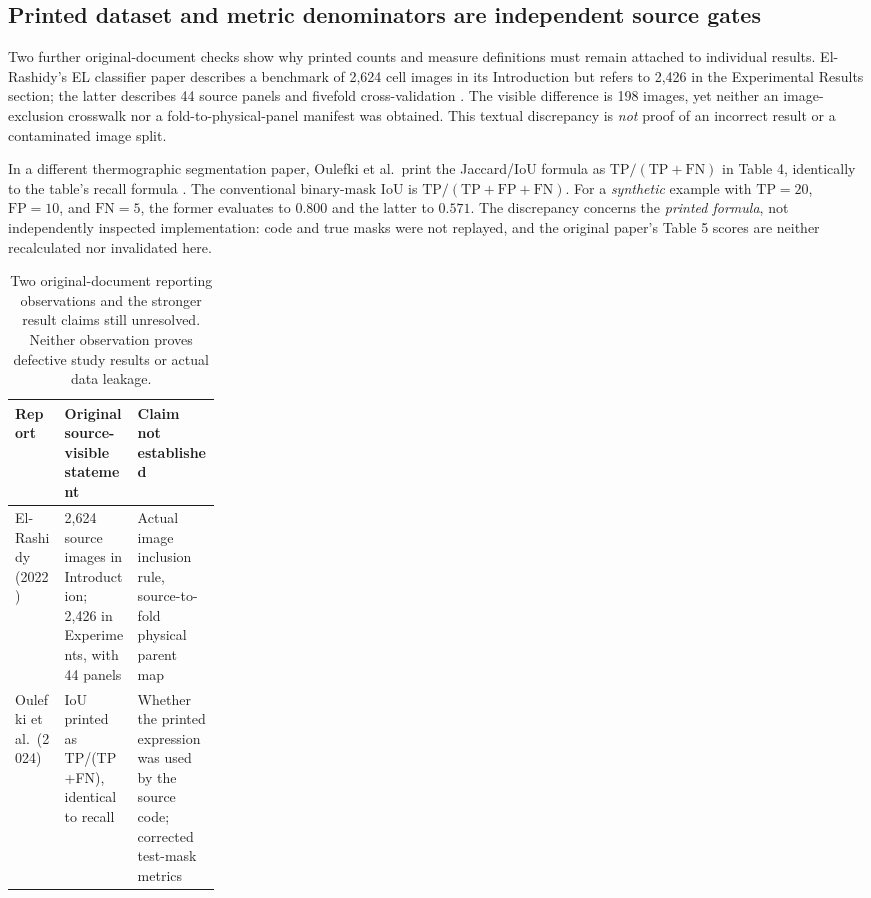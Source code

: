 \documentclass[10pt,a4paper]{article}
\begin{document}
\subsection{Printed dataset and metric denominators are independent source gates}
Two further original-document checks show why printed counts and measure definitions must remain attached to individual results. El-Rashidy's EL classifier paper describes a benchmark of 2,624 cell images in its Introduction but refers to 2,426 in the Experimental Results section; the latter describes 44 source panels and fivefold cross-validation \cite{elrashidy2022}. The visible difference is 198 images, yet neither an image-exclusion crosswalk nor a fold-to-physical-panel manifest was obtained. This textual discrepancy is \emph{not} proof of an incorrect result or a contaminated image split.

In a different thermographic segmentation paper, Oulefki et al.\ print the Jaccard/IoU formula as $\mathrm{TP}/(\mathrm{TP}+\mathrm{FN})$ in Table 4, identically to the table's recall formula \cite{oulefki2024}. The conventional binary-mask IoU is $\mathrm{TP}/(\mathrm{TP}+\mathrm{FP}+\mathrm{FN})$. For a \emph{synthetic} example with $\mathrm{TP}=20$, $\mathrm{FP}=10$, and $\mathrm{FN}=5$, the former evaluates to $0.800$ and the latter to $0.571$. The discrepancy concerns the \emph{printed formula}, not independently inspected implementation: code and true masks were not replayed, and the original paper's Table 5 scores are neither recalculated nor invalidated here.

\begin{table}[t]
\centering\small
\caption{Two original-document reporting observations and the stronger result claims still unresolved. Neither observation proves defective study results or actual data leakage.}
\begin{tabularx}{\linewidth}{@{}p{0.24\linewidth}XX@{}}
\toprule
Report & Original source-visible statement & Claim not established \\
\midrule
El-Rashidy (2022) & 2,624 source images in Introduction; 2,426 in Experiments, with 44 panels & Actual image inclusion rule, source-to-fold physical parent map \\
Oulefki et al.\ (2024) & IoU printed as TP/(TP+FN), identical to recall & Whether the printed expression was used by the source code; corrected test-mask metrics \\
\bottomrule
\end{tabularx}
\end{table}
\end{document}
